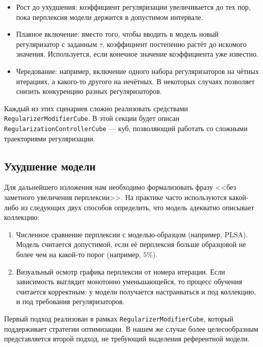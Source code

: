 \begin{itemize}
    \item Рост до ухудшения: коэффициент регуляризации увеличивается до тех пор, пока перплексия модели держится в допустимом интервале.
    \item Плавное включение: вместо того, чтобы вводить в модель новый регуляризатор с заданным $\tau$, коэффициент постепенно растёт до искомого значения. Используется, если конечное значение коэффициента уже известно.
    \item Чередование: например, включение одного набора регуляризаторов на чётных итерациях, а какого-то другого на нечётных. В некоторых случаях позволяет снизить конкуренцию разных регуляризаторов.
\end{itemize}

Каждый из этих сценариев сложно реализовать средствами \texttt{RegularizerModifierCube}. В этой секции будет описан \texttt{RegularizationControllerCube} --- куб, позволяющий работать со сложными траекториями регуляризации.

\subsection{Ухудшение модели}

Для дальнейшего изложения нам необходимо формализовать фразу <<без заметного увеличения перплексии>>. На практике часто используются какой-либо из следующих двух способов определить, что модель адекватно описывает коллекцию: 

\begin{enumerate}
    \item Численное сравнение перплексии с моделью-образцом (например, PLSA). Модель считается допустимой, если её перплексия больше образцовой не более чем на какой-то порог (например, $5\%$).
    \item Визуальный осмотр графика перплексии от номера итерации. Если зависимость выглядит монотонно уменьшающейся, то процесс обучения считается корректным: у модели получается настраиваться и под коллекцию, и под требования регуляризаторов.
\end{enumerate}

Первый подход реализован в рамках \texttt{RegularizerModifierCube}, который поддерживает стратегии оптимизации. В нашем же случае более целесообразным представляется второй подход, не требующий выделения референтной модели.

